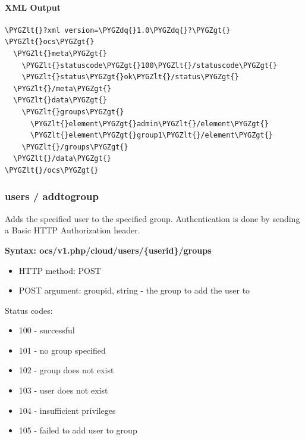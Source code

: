 \documentclass[letterpaper,10pt,english]{sphinxmanual}
\def\PYGZlt{\char`\<}
\def\PYGZgt{\char`\>}
\def\PYGZdq{\char`\"}
\begin{document}
\paragraph{XML Output}
\label{configuration_user/user_provisioning_api:id9}
\begin{Verbatim}[commandchars=\\\{\}]
\PYGZlt{}?xml version=\PYGZdq{}1.0\PYGZdq{}?\PYGZgt{}
\PYGZlt{}ocs\PYGZgt{}
  \PYGZlt{}meta\PYGZgt{}
    \PYGZlt{}statuscode\PYGZgt{}100\PYGZlt{}/statuscode\PYGZgt{}
    \PYGZlt{}status\PYGZgt{}ok\PYGZlt{}/status\PYGZgt{}
  \PYGZlt{}/meta\PYGZgt{}
  \PYGZlt{}data\PYGZgt{}
    \PYGZlt{}groups\PYGZgt{}
      \PYGZlt{}element\PYGZgt{}admin\PYGZlt{}/element\PYGZgt{}
      \PYGZlt{}element\PYGZgt{}group1\PYGZlt{}/element\PYGZgt{}
    \PYGZlt{}/groups\PYGZgt{}
  \PYGZlt{}/data\PYGZgt{}
\PYGZlt{}/ocs\PYGZgt{}
\end{Verbatim}


\subsubsection{\textbf{users / addtogroup}}
\label{configuration_user/user_provisioning_api:users-addtogroup}
Adds the specified user to the specified group. Authentication is done by
sending a Basic HTTP Authorization header.

\textbf{Syntax: ocs/v1.php/cloud/users/\{userid\}/groups}
\begin{itemize}
\item {} 
HTTP method: POST

\item {} 
POST argument: groupid, string - the group to add the user to

\end{itemize}

Status codes:
\begin{itemize}
\item {} 
100 - successful

\item {} 
101 - no group specified

\item {} 
102 - group does not exist

\item {} 
103 - user does not exist

\item {} 
104 - insufficient privileges

\item {} 
105 - failed to add user to group

\end{itemize}
\end{document}
